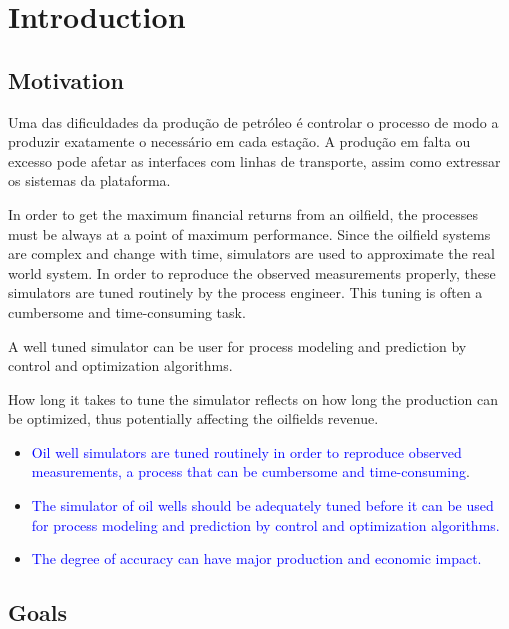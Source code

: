 

\chapter{Introduction} \label{chap:1}



\section{Motivation}

Uma das dificuldades da produção de petróleo é controlar o processo de modo a produzir exatamente o necessário em cada estação. A produção em falta ou excesso pode afetar as interfaces com linhas de transporte, assim como extressar os sistemas da plataforma.

 In order to get the maximum financial returns from an oilfield, the processes must be always at a point of maximum performance. Since the oilfield systems are complex and change with time, simulators are used to approximate the real world system. In order to reproduce the observed measurements properly, 
these simulators are tuned routinely by the process engineer. This tuning is often a cumbersome and time-consuming task.

A well tuned simulator can be user for process modeling and prediction by control and optimization algorithms.

How long it takes to tune the simulator reflects on how long the production can be optimized, thus potentially affecting the oilfields revenue.


\begin{itemize}

 \item \textcolor{blue}{Oil well simulators are tuned routinely in order to reproduce observed measurements, a process that can be cumbersome and time-consuming}.
 
 \item \textcolor{blue}{The simulator of oil wells should be adequately tuned before it can be used for process modeling and prediction by control and optimization algorithms.}
 
 \item \textcolor{blue}{The degree of accuracy can have major production and economic impact.}
\end{itemize}


\section{Goals}

